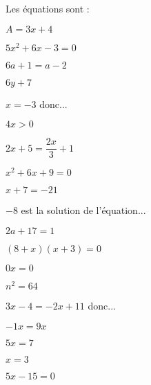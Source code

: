 
\begin{QCM}
\begin{GroupeQCM}

\begin{exercice}
Les équations sont :
\begin{ChoixQCM}{4}
\item $A = 3x + 4$
\item $5x^2 + 6x - 3 = 0$
\item $6a + 1 = a - 2$
\item $6y + 7$
\end{ChoixQCM}

\begin{corrige}
\end{corrige}
\end{exercice}



\begin{exercice}
$x = -3$ donc...
\begin{ChoixQCM}{4}
\item $4x > 0$
\item $2x + 5 = \dfrac{2x}{3}+ 1$
\item $x^2 + 6x + 9 = 0$
\item $x + 7 = - 21$
\end{ChoixQCM}

\begin{corrige}
\end{corrige}
\end{exercice}



\begin{exercice}
$-8$ est la solution de l'équation...
\begin{ChoixQCM}{4}
\item $2a + 17 = 1$
\item $(8 + x)(x + 3) = 0$
\item $0x = 0$
\item $n^2 = 64$
\end{ChoixQCM}

\begin{corrige}
\end{corrige}
\end{exercice}



\begin{exercice}
$3x - 4 = -2x + 11$ donc...
\begin{ChoixQCM}{4}
\item $-1x = 9x$
\item $5x = 7$
\item $x = 3$
\item $5x - 15 = 0$
\end{ChoixQCM}


\end{exercice}
\end{GroupeQCM}
\end{QCM}
